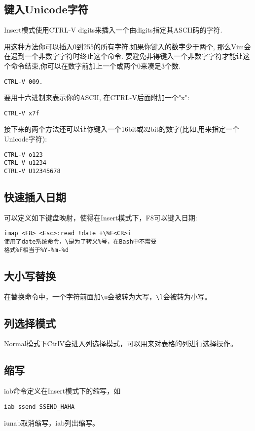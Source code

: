 \subsection{键入Unicode字符}
Insert模式使用CTRL-V {digits}来插入一个由{digits}指定其ASCII码的字符. 

用这种方法你可以插入0到255的所有字符.如果你键入的数字少于两个, 那么Vim会在遇到一个非数字字符时终止这个命令. 要避免非得键入一个非数字字符才能让这个命令结束,你可以在数字前加上一个或两个0来凑足3个数.

\begin{verbatim}
CTRL-V 009.
\end{verbatim}

要用十六进制来表示你的ASCII, 在CTRL-V后面附加一个"x":
\begin{verbatim}
CTRL-V x7f
\end{verbatim}

接下来的两个方法还可以让你键入一个16bit或32bit的数字(比如,用来指定一个Unicode字符):
\begin{verbatim}
CTRL-V o123
CTRL-V u1234
CTRL-V U12345678
\end{verbatim}

\subsection{快速插入日期}
可以定义如下键盘映射，使得在Insert模式下，F8可以键入日期:
\begin{verbatim}
imap <F8> <Esc>:read !date +\%F<CR>i
使用了date系统命令，\是为了转义%号，在Bash中不需要
格式%F相当于%Y-%m-%d
\end{verbatim}

\subsection{大小写替换}
在替换命令中，一个字符前面加\verb+\u+会被转为大写，\verb+\l+会被转为小写。


\subsection{列选择模式}
Normal模式下CtrlV会进入列选择模式，可以用来对表格的列进行选择操作。


\subsection{缩写}
iab命令定义在Insert模式下的缩写，如

\begin{verbatim}
iab ssend SSEND_HAHA
\end{verbatim}
iunab取消缩写，iab列出缩写。

